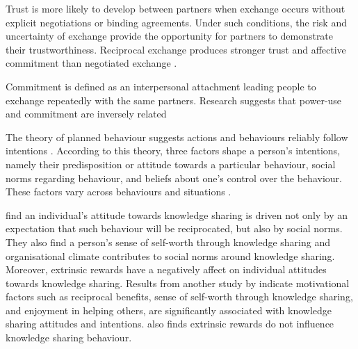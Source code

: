 Trust is more likely to develop between partners when exchange occurs without explicit negotiations or binding agreements. Under such conditions, the risk and uncertainty of exchange provide the opportunity for partners to demonstrate their trustworthiness. Reciprocal exchange produces stronger trust and affective commitment than negotiated exchange \citep{molm2000risk}. 

Commitment is defined as an interpersonal attachment leading people to exchange repeatedly with the same partners. Research suggests that power-use and commitment are inversely related \citep{cook1978power}

The theory of planned behaviour suggests actions and behaviours reliably follow intentions \citep{ajzen1985intentions}. According to this theory, three factors shape a person's intentions, namely their predisposition or attitude towards a particular behaviour, social norms regarding behaviour, and beliefs about one's control over the behaviour. These factors vary across behaviours and situations \citep{ajzen1991theory}. \medskip

\citet{bock2005behavioral} find an individual's attitude towards knowledge sharing is driven not only by an expectation that such behaviour will be reciprocated, but also by social norms. They also find a person's sense of self-worth through knowledge sharing and organisational climate contributes to social norms around knowledge sharing. Moreover, extrinsic rewards have a negatively affect on individual attitudes towards knowledge sharing. Results from another study by \citet{lin2007effects} indicate motivational factors such as reciprocal benefits, sense of self-worth through knowledge sharing, and enjoyment in helping others, are significantly associated with knowledge sharing attitudes and intentions. \citet{lin2007effects} also finds extrinsic rewards do not influence knowledge sharing behaviour. \medskip

